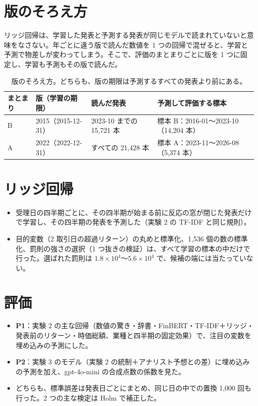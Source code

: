 \documentclass[xelatex,ja=standard,jafont=haranoaji,a4paper,10pt,openany]{bxjsreport}
\begin{document}
\section{版のそろえ方}

リッジ回帰は、学習した発表と予測する発表が同じモデルで読まれていないと意味をなさない。年ごとに違う版で読んだ数値を 1 つの回帰で混ぜると、学習と予測で物差しが変わってしまう。そこで、評価のまとまりごとに版を 1 つに固定し、学習も予測もその版で読んだ。

\begin{table}[H]
\centering
\caption{版のそろえ方。どちらも、版の期限は予測するすべての発表より前にある。}
\small
\begin{tabular}{llll}
\toprule
まとまり & 版（学習の期限） & 読んだ発表 & 予測して評価する標本 \\
\midrule
B & 2015（2015-12-31） & 2023-10 までの 15,721 本 & 標本 B：2016-01〜2023-10（14,204 本） \\
A & 2022（2022-12-31） & すべての 21,428 本 & 標本 A：2023-11〜2026-08（5,374 本） \\
\bottomrule
\end{tabular}
\end{table}

\section{リッジ回帰}

\begin{itemize}
\item 受理日の四半期ごとに、その四半期が始まる前に反応の窓が閉じた発表だけで学習し、その四半期の発表を予測した（実験 2 の TF-IDF と同じ規則）。
\item 目的変数（2 取引日の超過リターン）の丸めと標準化、1,536 個の数の標準化、罰則の強さの選択（1 つ抜きの検証）は、すべて学習の標本の中だけで行った。選ばれた罰則は $1.8\times10^4$〜$5.6\times10^4$ で、候補の端には当たっていない。
\end{itemize}

\section{評価}

\begin{itemize}
\item \textbf{P1}：実験 2 の主な回帰（数値の驚き・辞書・FinBERT・TF-IDF＋リッジ・発表前のリターン・時価総額、業種と四半期の固定効果）で、注目の変数を埋め込みの予測にした。
\item \textbf{P2}：実験 3 のモデル（実験 2 の統制＋アナリスト予想との差）に埋め込みの予測を加え、gpt-4o-mini の合成点数の係数を見た。
\item どちらも、標準誤差は発表日ごとにまとめ、同じ日の中での置換 1,000 回も行った。2 つの主な検定は Holm で補正した。
\end{itemize}
\end{document}
